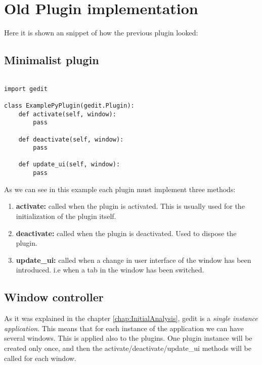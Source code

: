 
\newpage
\section{Old Plugin implementation}

Here it is shown an snippet of how the previous plugin looked:

\subsection{Minimalist plugin}

\begin{lstlisting}[style=python]

import gedit

class ExamplePyPlugin(gedit.Plugin):
    def activate(self, window):
        pass

    def deactivate(self, window):
        pass

    def update_ui(self, window):
        pass

\end{lstlisting}

As we can see in this example each plugin must implement three methods:
\begin{enumerate}
  \item \textbf{activate:} called when the plugin is activated. This is usually used for the initialization of the plugin itself.
  \item \textbf{deactivate:} called when the plugin is deactivated. Used to dispose the plugin.
  \item \textbf{update\_ui:} called when a change in user interface of the window has been introduced. i.e when a tab in the window has been switched.
\end{enumerate}

\subsection{Window controller}\label{sec:WindowController}

As it was explained in the chapter \ref{chap:InitialAnalysis}, gedit is a \emph{single instance application}. This means that for each instance of the application we can have several windows. This is applied also to the plugins. One plugin instance will be created only once, and then the activate/deactivate/update\_ui methods will be called for each window.

